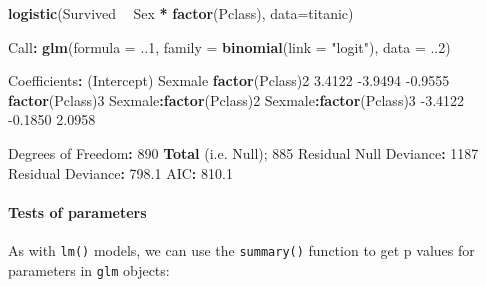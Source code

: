 \documentclass[]{article}
\newenvironment{Shaded}{\begin{snugshade}}{\end{snugshade}}
\newcommand{\DataTypeTok}[1]{\textcolor[rgb]{0.13,0.29,0.53}{#1}}
\newcommand{\DecValTok}[1]{\textcolor[rgb]{0.00,0.00,0.81}{#1}}
\newcommand{\FloatTok}[1]{\textcolor[rgb]{0.00,0.00,0.81}{#1}}
\newcommand{\KeywordTok}[1]{\textcolor[rgb]{0.13,0.29,0.53}{\textbf{#1}}}
\newcommand{\NormalTok}[1]{#1}
\newcommand{\OperatorTok}[1]{\textcolor[rgb]{0.81,0.36,0.00}{\textbf{#1}}}
\newcommand{\StringTok}[1]{\textcolor[rgb]{0.31,0.60,0.02}{#1}}
\let\oldparagraph\paragraph
\renewcommand{\paragraph}[1]{\oldparagraph{#1}\mbox{}}
\begin{document}
\begin{Shaded}
\begin{Highlighting}[]
\KeywordTok{logistic}\NormalTok{(Survived }\OperatorTok{~}\StringTok{ }\NormalTok{Sex }\OperatorTok{*}\StringTok{ }\KeywordTok{factor}\NormalTok{(Pclass), }\DataTypeTok{data=}\NormalTok{titanic)}

\NormalTok{Call}\OperatorTok{:}\StringTok{  }\KeywordTok{glm}\NormalTok{(}\DataTypeTok{formula =}\NormalTok{ ..}\DecValTok{1}\NormalTok{, }\DataTypeTok{family =} \KeywordTok{binomial}\NormalTok{(}\DataTypeTok{link =} \StringTok{"logit"}\NormalTok{), }\DataTypeTok{data =}\NormalTok{ ..}\DecValTok{2}\NormalTok{)}

\NormalTok{Coefficients}\OperatorTok{:}
\StringTok{            }\NormalTok{(Intercept)                  Sexmale          }\KeywordTok{factor}\NormalTok{(Pclass)}\DecValTok{2}  
                 \FloatTok{3.4122}                  \FloatTok{-3.9494}                  \FloatTok{-0.9555}  
        \KeywordTok{factor}\NormalTok{(Pclass)}\DecValTok{3}\NormalTok{  Sexmale}\OperatorTok{:}\KeywordTok{factor}\NormalTok{(Pclass)}\DecValTok{2}\NormalTok{  Sexmale}\OperatorTok{:}\KeywordTok{factor}\NormalTok{(Pclass)}\DecValTok{3}  
                \FloatTok{-3.4122}                  \FloatTok{-0.1850}                   \FloatTok{2.0958}  

\NormalTok{Degrees of Freedom}\OperatorTok{:}\StringTok{ }\DecValTok{890} \KeywordTok{Total}\NormalTok{ (i.e. Null);  }\DecValTok{885}\NormalTok{ Residual}
\NormalTok{Null Deviance}\OperatorTok{:}\StringTok{      }\DecValTok{1187} 
\NormalTok{Residual Deviance}\OperatorTok{:}\StringTok{ }\FloatTok{798.1}\NormalTok{    AIC}\OperatorTok{:}\StringTok{ }\FloatTok{810.1}
\end{Highlighting}
\end{Shaded}

\hypertarget{tests-of-parameters}{%
\paragraph{Tests of parameters}\label{tests-of-parameters}}

As with \texttt{lm()} models, we can use the \texttt{summary()} function to get p values for
parameters in \texttt{glm} objects:
\end{document}
